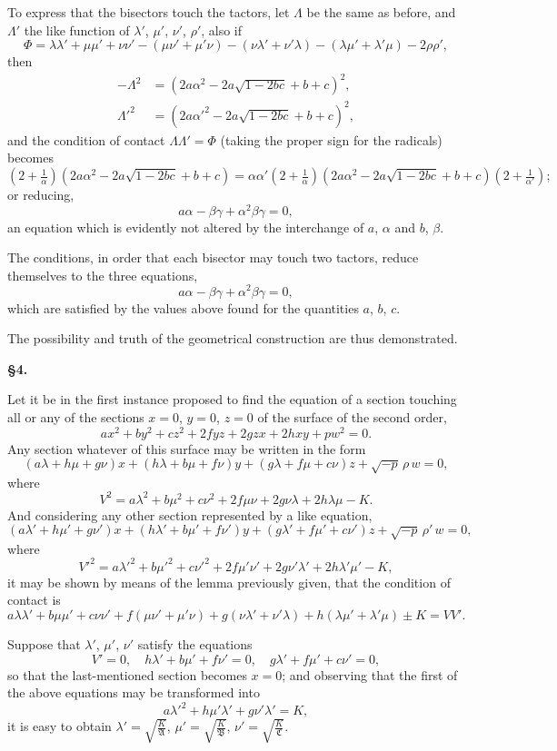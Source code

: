 \documentclass[11pt]{article}
\begin{document}
To express that the bisectors touch the tactors, let $\Lambda$ be the same as before, and $\Lambda'$ the like function of $\lambda'$, $\mu'$, $\nu'$, $\rho'$, also if
\[
\Phi = \lambda\lambda' + \mu\mu' + \nu\nu' - (\mu\nu'+\mu'\nu) - (\nu\lambda'+\nu'\lambda) - (\lambda\mu'+\lambda'\mu) - 2\rho\rho',
\]
then
\begin{align*}
-\Lambda^2 &= (2a\alpha^2 - 2a\sqrt{1-2bc} + b + c)^2,\\
\Lambda'^2 &= (2a\alpha'^2 - 2a\sqrt{1-2bc} + b + c)^2,
\end{align*}
and the condition of contact $\Lambda\Lambda' = \Phi$ (taking the proper sign for the radicals) becomes
\[
(2+\tfrac{1}{\alpha})(2a\alpha^2 - 2a\sqrt{1-2bc} + b + c) = \alpha\alpha'(2+\tfrac{1}{\alpha})(2a\alpha^2 - 2a\sqrt{1-2bc} + b + c)(2+\tfrac{1}{\alpha'});
\]
or reducing,
\[
a\alpha - \beta\gamma + \alpha^2\beta\gamma = 0,
\]
an equation which is evidently not altered by the interchange of $a$, $\alpha$ and $b$, $\beta$.

The conditions, in order that each bisector may touch two tactors, reduce themselves to the three equations,
\[
a\alpha - \beta\gamma + \alpha^2\beta\gamma = 0,
\]
which are satisfied by the values above found for the quantities $a$, $b$, $c$.

The possibility and truth of the geometrical construction are thus demonstrated.


\newpage
\setcounter{page}{64}

\noindent\textbf{\S 4.}

Let it be in the first instance proposed to find the equation of a section touching all or any of the sections $x=0$, $y=0$, $z=0$ of the surface of the second order,
\[
ax^2+by^2+cz^2+2fyz+2gzx+2hxy+pw^2=0.
\]
Any section whatever of this surface may be written in the form
\[
(a\lambda+h\mu+g\nu)x + (h\lambda+b\mu+f\nu)y + (g\lambda+f\mu+c\nu)z + \sqrt{-p}\,\rho\,w = 0,
\]
where
\[
V^2 = a\lambda^2 + b\mu^2 + c\nu^2 + 2f\mu\nu + 2g\nu\lambda + 2h\lambda\mu - K.
\]
And considering any other section represented by a like equation,
\[
(a\lambda'+h\mu'+g\nu')x + (h\lambda'+b\mu'+f\nu')y + (g\lambda'+f\mu'+c\nu')z + \sqrt{-p}\,\rho'\,w = 0,
\]
where
\[
V'^2 = a\lambda'^2 + b\mu'^2 + c\nu'^2 + 2f\mu'\nu' + 2g\nu'\lambda' + 2h\lambda'\mu' - K,
\]
it may be shown by means of the lemma previously given, that the condition of contact is
\[
a\lambda\lambda'+b\mu\mu'+c\nu\nu'+f(\mu\nu'+\mu'\nu)+g(\nu\lambda'+\nu'\lambda)+h(\lambda\mu'+\lambda'\mu) \pm K = VV'.
\]

Suppose that $\lambda'$, $\mu'$, $\nu'$ satisfy the equations
\[
V' = 0, \quad h\lambda'+b\mu'+f\nu' = 0, \quad g\lambda'+f\mu'+c\nu' = 0,
\]
so that the last-mentioned section becomes $x=0$; and observing that the first of the above equations may be transformed into
\[
a\lambda'^2+h\mu'\lambda'+g\nu'\lambda' = K,
\]
it is easy to obtain $\lambda'=\sqrt{\tfrac{K}{\mathfrak{A}}}$, $\mu'=\sqrt{\tfrac{K}{\mathfrak{B}}}$, $\nu'=\sqrt{\tfrac{K}{\mathfrak{C}}}$.
\end{document}

